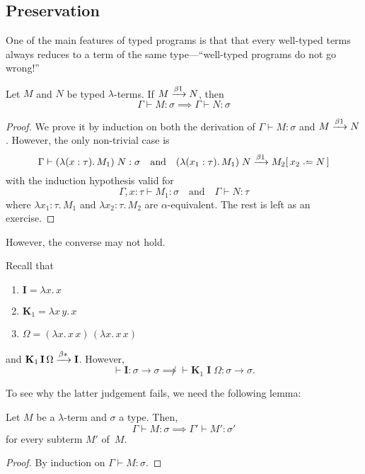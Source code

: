 \subsection{Preservation}
One of the main features of typed programs is that that every well-typed terms
always reduces to a term of the same type---``well-typed programs do not go
wrong!''
\begin{theorem}
  \label{thm:preservation}
  Let $M$ and $N$ be typed $\lambda$-terms. 
  If $M \xrightarrow{\beta1} N$, then
  \[
    \Gamma \vdash M : \sigma \implies \Gamma \vdash N : \sigma
  \]
\end{theorem}
\begin{proof}
  We prove it by induction on both the derivation of $\Gamma \vdash M :
  \sigma$ and $M \xrightarrow{\beta1} N$. However, the only non-trivial case is
  \[
    \Gamma \vdash (\lambda (x : \tau).\, M_1)\; N : \sigma
    \quad\text{and}\quad
    (\lambda (x_1 : \tau).\, M_1)\;N \onereduce M_2\subst{x_2}{N}
  \]
  with the induction hypothesis valid for
  \[
    \Gamma, x : \tau \vdash M_1 : \sigma
    \quad\text{and}\quad
    \Gamma \vdash N : \tau
  \]
  where $\lambda x_1:\tau.\,M_1$ and $\lambda x_2:\tau.\,M_2$ are
  $\alpha$-equivalent. The rest is left as an exercise.
\end{proof}
However, the converse may not hold.
\begin{example}
  Recall that 
  \begin{enumerate}
    \item $\mathbf{I} = \lambda x.\, x$
    \item $\mathbf{K}_1 = \lambda x\,y.\, x$
    \item $\Omega = (\lambda x.\, x\,x)\,(\lambda x.\, x\,x)$
  \end{enumerate}
  and $\mathbf{K}_1\,\mathbf{I}\,\Omega \xrightarrow{\beta*} \mathbf{I}$. However, 
  \[
    \vdash \mathbf{I} : \sigma \to \sigma
    \not\implies
    \vdash \mathbf{K}_1\;\mathbf{I}\;\Omega : \sigma \to \sigma.
  \]
\end{example}
To see why the latter judgement fails, we need the following lemma:
\begin{lemma}
  Let $M$ be a  $\lambda$-term and $\sigma$ a type. Then,  
  \[
    \Gamma \vdash M : \sigma 
    \implies \Gamma' \vdash M' : \sigma'
  \]
  for every subterm $M'$ of~$M$.
\end{lemma}
\begin{proof}
  By induction on $\Gamma \vdash M : \sigma$.
\end{proof}
%
%
